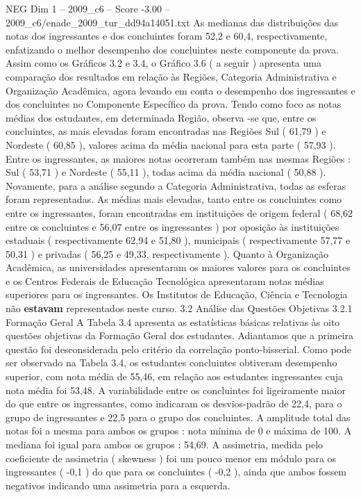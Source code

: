 \begin{textsample}{NEG Dim 1 – 2009\_c6 – Score -3.00 – 2009\_c6/enade\_2009\_tur\_dd94a14051.txt}
As medianas das distribuições das notas dos ingressantes e dos concluintes foram 52,2 e 60,4, respectivamente, enfatizando o melhor desempenho dos concluintes neste componente da prova.
Assim como os Gráficos 3.2 e 3.4, o Gráfico 3.6 ( a seguir ) apresenta uma comparação dos resultados em relação às Regiões, Categoria Administrativa e Organização Acadêmica, agora levando em conta o desempenho dos ingressantes e dos concluintes no Componente Específico da prova.
Tendo como foco as notas médias dos estudantes, em determinada Região, observa -se que, entre os concluintes, as mais elevadas foram encontradas nas Regiões Sul ( 61,79 ) e Nordeste ( 60,85 ), valores acima da média nacional para esta parte ( 57,93 ).
Entre os ingressantes, as maiores notas ocorreram também nas mesmas Regiões : Sul ( 53,71 ) e Nordeste ( 55,11 ), todas acima da média nacional ( 50,88 ).
Novamente, para a análise segundo a Categoria Administrativa, todas as esferas foram representadas.
As médias mais elevadas, tanto entre os concluintes como entre os ingressantes, foram encontradas em instituições de origem federal ( 68,62 entre os concluintes e 56,07 entre os ingressantes ) por oposição às instituições estaduais ( respectivamente 62,94 e 51,80 ), municipais ( respectivamente 57,77 e 50,31 ) e privadas ( 56,25 e 49,33, respectivamente ).
Quanto à Organização Acadêmica, as universidades apresentaram os maiores valores para os concluintes e os Centros Federais de Educação Tecnológica apresentaram notas médias superiores para os ingressantes.
Os Institutos de Educação, Ciência e Tecnologia não \textbf{estavam} representados neste curso. 3.2 Análise das Questões Objetivas 3.2.1 Formação Geral A Tabela 3.4 apresenta as estatísticas básicas relativas às oito questões objetivas da Formação Geral dos estudantes.
Adiantamos que a primeira questão foi desconsiderada pelo critério da correlação ponto-bisserial.
Como pode ser observado na Tabela 3.4, os estudantes concluintes obtiveram desempenho superior, com nota média de 55,46, em relação aos estudantes ingressantes cuja nota média foi 53,48.
A variabilidade entre os concluintes foi ligeiramente maior do que entre os ingressantes, como indicaram os desvios-padrão de 22,4, para o grupo de ingressantes e 22,5 para o grupo dos concluintes.
A amplitude total das notas foi a mesma para ambos os grupos : nota mínima de 0 e máxima de 100.
A mediana foi igual para ambos os grupos : 54,69.
A assimetria, medida pelo coeficiente de assimetria ( skewness ) foi um pouco menor em módulo para os ingressantes ( -0,1 ) do que para os concluintes ( -0,2 ), ainda que ambos fossem negativos indicando uma assimetria para a esquerda.

\end{textsample}
